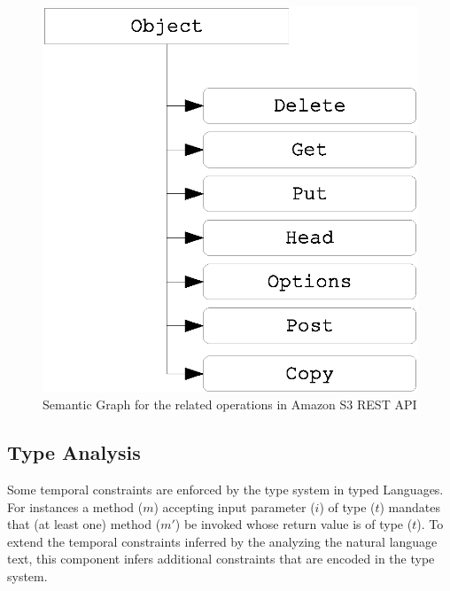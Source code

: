 \begin{figure}
	\centering
	\includegraphics[scale=0.3]{KnowledgeGraph.eps}
	\caption{Semantic Graph for the  related operations in Amazon S3 REST API}
	\label{fig:knowledge}
\end{figure}

\subsection{Type Analysis}

Some temporal constraints are enforced by the type system in typed Languages.
For instances a method ($m$) accepting input parameter ($i$) of type ($t$) mandates that (at least one) method ($m'$) be invoked whose return value is of type ($t$).
To extend the temporal constraints inferred by the analyzing the natural language text, this component infers additional constraints that are encoded
in the type system. %

